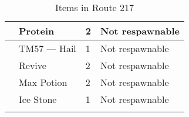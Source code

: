 \begin{longtable}{|| l l l l ||}%
\hline%
&Protein&2&Not respawnable\\%
\hline%
&TM57 — Hail&1&Not respawnable\\%
\hline%
&Revive&2&Not respawnable\\%
\hline%
&Max Potion&2&Not respawnable\\%
\hline%
&Ice Stone&1&Not respawnable\\%
\hline%
\endhead%
\hline%
\caption{Items in Route 217}%
\label{tab:Route217Items}%
\end{longtable}